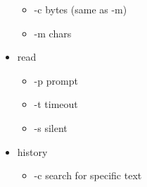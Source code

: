 \documentclass{report}
\begin{document}
\begin{itemize}
\begin{itemize}
                \item -c bytes (same as -m)
                \item -m chars
            \end{itemize}
        \item read 
            \begin{itemize}
                \item -p prompt
                \item -t timeout
                \item -s silent
            \end{itemize}
        \item history
            \begin{itemize}
                \item -c search for specific text
            \end{itemize}


    \end{itemize}
    
\end{document}
